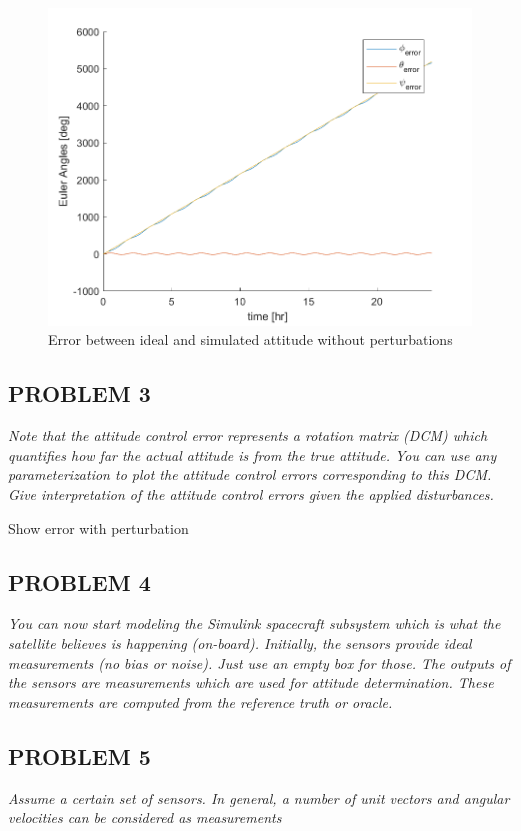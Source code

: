 \begin{figure}[H]
\centering
\includegraphics[scale=0.6]{Images/ps6_problem2.png}
\caption{Error between ideal and simulated attitude without perturbations}
\label{fig:Images/ps6_problem2.png}
\end{figure}

\subsection{PROBLEM 3}
\textit{Note that the attitude control error represents a rotation matrix (DCM) which quantifies how far the actual attitude is from the true attitude. You can use any parameterization to plot the attitude control errors corresponding to this DCM. Give interpretation of the attitude control errors given the applied disturbances.}

Show error with perturbation

\subsection{PROBLEM 4}
\textit{You can now start modeling the Simulink spacecraft subsystem which is what the satellite believes is happening (on-board). Initially, the sensors provide ideal measurements (no bias or noise). Just use an empty box for those. The outputs of the sensors are measurements which are used for attitude determination. These measurements are computed from the reference truth or oracle.}

\subsection{PROBLEM 5}
\textit{Assume a certain set of sensors. In general, a number of unit vectors and angular velocities can be considered as measurements}

